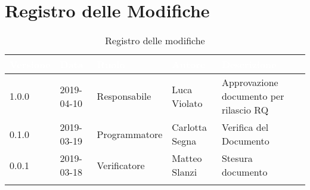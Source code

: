 \newpage

\section*{Registro delle Modifiche}

\begin{center}
\begin{longtable}[c]{|m{}|m{}|m{}|m{}|p{}|}
\hline
\rowcolor{bluelogo}\textbf{\textcolor{white}{Versione}} & \textbf{\textcolor{white}{Data}} & \textbf{\textcolor{white}{Ruolo}} & \textbf{\textcolor{white}{Autore}} & \textbf{\textcolor{white}{Descrizione}}\\
\hline \hline
\endfirsthead
1.0.0 & 2019-04-10 & Responsabile & Luca Violato & Approvazione documento per rilascio RQ \\
\hline
\rowcolor{grigio} 0.1.0 & 2019-03-19 & Programmatore & Carlotta Segna & Verifica del Documento \\
\hline
0.0.1 & 2019-03-18 & Verificatore & Matteo Slanzi & Stesura documento \\
\hline
\caption{Registro delle modifiche}
\end{longtable}
\end{center}

